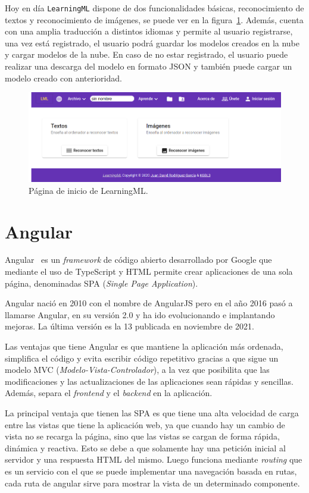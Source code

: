 \documentclass[a4paper, 12pt]{book}
\begin{document}
Hoy en día \texttt{LearningML} dispone de dos funcionalidades básicas, reconocimiento de textos y reconocimiento de imágenes, se puede ver en la figura~\ref{fig:learningML}.
Además, cuenta con una amplia traducción a distintos idiomas y  permite al usuario registrarse, una vez está registrado, el usuario podrá guardar los modelos creados en la nube y cargar modelos de la nube. En caso de no estar registrado, el usuario puede realizar una descarga del modelo en formato JSON y también puede cargar un modelo creado con anterioridad.

\begin{figure}
	\centering
	\includegraphics[width=13cm, keepaspectratio]{img/LearningML.png}
	\caption{Página de inicio de LearningML.} \label{fig:learningML}
\end{figure}

\section{Angular} 
\label{sec:Angular}

Angular~\cite{Pagina_de_angular, Curso_de_angular} es un \emph{framework} de código abierto desarrollado por Google que mediante el uso de TypeScript y HTML permite crear aplicaciones de una sola página, denominadas SPA (\emph{Single Page Application}).

Angular nació en 2010 con el nombre de AngularJS pero en el año 2016 pasó a llamarse Angular, en su versión 2.0 y ha ido evolucionando e implantando mejoras. 
La última versión es la 13 publicada en noviembre de 2021.

Las ventajas que tiene Angular es que mantiene la aplicación más ordenada, simplifica el código y evita escribir código repetitivo gracias a que sigue un modelo MVC (\emph{Modelo-Vista-Controlador}), a la vez que posibilita que las modificaciones y las actualizaciones de las aplicaciones sean rápidas y sencillas. 
Además, separa el \emph{frontend} y el \emph{backend} en la aplicación.

La principal ventaja que tienen las SPA es que tiene una alta velocidad de carga entre las vistas que tiene la aplicación web, ya que cuando hay un cambio de vista no se recarga la página, sino que las vistas se cargan de forma rápida, dinámica y reactiva. 
Esto se debe a que solamente hay una petición inicial al servidor y una respuesta HTML del mismo. Luego funciona mediante \emph{routing} que es un servicio con el que se puede implementar una navegación basada en rutas, cada ruta de angular sirve para mostrar la vista de un determinado componente.
\end{document}
